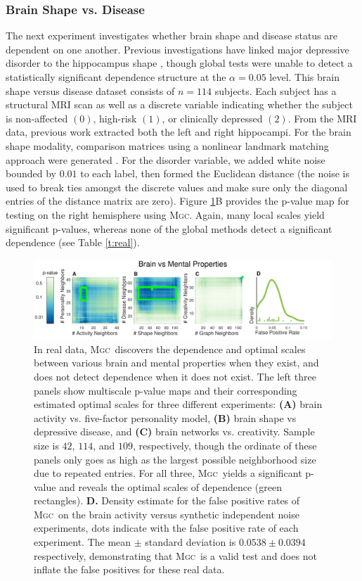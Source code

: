 \documentclass[11pt]{article}
\providecommand{\sct}[1]{{\normalfont\textsc{#1}}}
\newcommand{\Mgc}{\sct{Mgc}}
\begin{document}
\subsubsection*{Brain Shape vs. Disease} 


The next experiment investigates whether brain shape and disease status are dependent on one another.  Previous investigations have linked major depressive disorder to the hippocampus shape \cite{ParkEtAl2008,PosenerEtAl2003}, though global tests were unable to detect a statistically significant dependence structure at the $\alpha=0.05$ level.
This brain shape versus disease dataset consists of $n=114$ subjects. Each subject has a structural MRI scan as well as a discrete variable indicating whether the subject is non-affected $(0)$, high-risk $(1)$, or clinically depressed $(2)$.  From the MRI data, previous work extracted both the left and right hippocampi. For the brain shape modality, comparison matrices using a nonlinear landmark matching approach were generated \cite{ParkEtAl2008,BegEtAl2005}. For the disorder variable, we added white noise bounded by $0.01$ to each label, then formed the Euclidean distance (the noise is used to break ties amongst the discrete values and make sure only the diagonal entries of the distance matrix are zero).
% 
Figure \ref{f:real}{\color{magenta}B} provides the p-value map for testing on the right hemisphere using \Mgc. Again, many local scales yield significant p-values, whereas none of the global methods detect a significant dependence  (see Table \ref{t:real}). 

\begin{figure}[htbp]
\includegraphics[width=1.0\textwidth,trim={0 0 1.5cm 0},clip]{Figures/FigReal}
\caption{In real data, \Mgc~discovers the dependence and optimal scales between various brain and mental properties when they exist, and does not detect dependence when it does not exist.  The left three panels show multiscale p-value maps and their corresponding estimated optimal scales for three different experiments: \textbf{(A)}  brain activity vs. five-factor personality model, \textbf{(B)}  brain shape vs depressive disease, and \textbf{(C)} brain networks vs. creativity. Sample size is $42$, $114$, and $109$, respectively, though the ordinate of these panels only goes as high as the largest possible neighborhood size due to repeated entries.  
For all three, \Mgc~yields a significant p-value and reveals the optimal scales of dependence (green rectangles).
\textbf{D.} Density estimate for the false positive rates of  \Mgc~on the brain activity versus synthetic independent noise experiments, dots indicate with the false positive rate of each experiment. The mean $\pm$ standard deviation is $0.0538 \pm 0.0394$ respectively, demonstrating that \Mgc~is a valid test and does not inflate the false positives for these real data.}
\label{f:real}
\end{figure}
\end{document}
